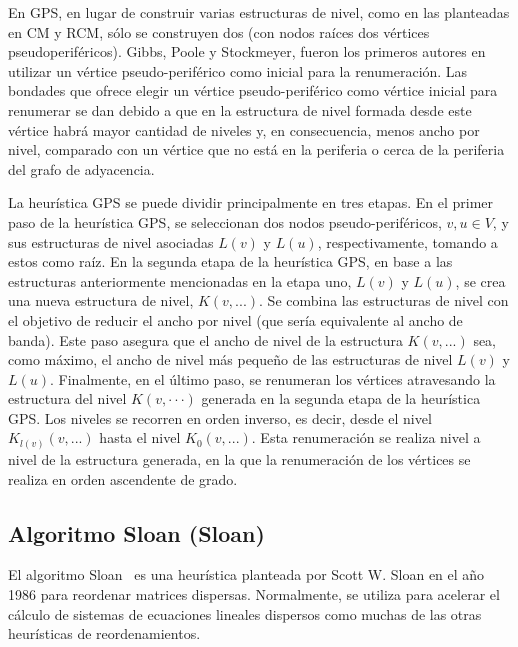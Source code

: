 En GPS, en lugar de construir varias estructuras de nivel, como en las planteadas en CM y RCM,  sólo se construyen dos (con nodos raíces dos vértices pseudoperiféricos). Gibbs, Poole y Stockmeyer, fueron los primeros autores en utilizar un vértice pseudo-periférico como inicial para la renumeración. Las bondades que ofrece elegir un vértice pseudo-periférico como vértice inicial para renumerar se dan debido a que en la estructura de nivel formada desde este vértice habrá mayor cantidad de niveles y, en consecuencia, menos ancho por nivel, comparado con un vértice que no está en la periferia o cerca de la periferia del grafo de adyacencia.

La heurística GPS se puede dividir principalmente en tres etapas. 
En el primer paso de la heurística GPS, se seleccionan dos nodos pseudo-periféricos, $v, u \in V$, y sus estructuras de nivel asociadas $\mathit{L}(v)$ y $\mathit{L}(u)$, respectivamente, tomando a estos como raíz.
En la segunda etapa de la heurística GPS, en base a las estructuras anteriormente mencionadas en la etapa uno, $L(v)$ y $L(u)$, se crea una nueva estructura de nivel, $K(v, ...)$. Se combina las estructuras de nivel con el objetivo de reducir el ancho por nivel (que sería equivalente al ancho de banda). Este paso asegura que el ancho de nivel de la estructura $K (v, ...)$ sea, como máximo, el ancho de nivel más pequeño de las estructuras de nivel $\mathit{L}(v)$ y $\mathit{L}(u)$.
Finalmente, en el último paso, se renumeran los vértices atravesando la estructura del nivel $K(v, ···)$ generada en la segunda etapa de la heurística GPS. Los niveles se recorren en orden inverso, es decir, desde el nivel $K_{l(v)}(v, ...)$ hasta el nivel $K_{0}(v, ...)$. Esta renumeración se realiza nivel a nivel de la estructura generada, en la que la renumeración de los vértices se realiza en orden ascendente de grado. 



\subsection{Algoritmo Sloan (Sloan)}


El algoritmo Sloan~\cite{Sloan1986} es una heurística planteada por Scott W. Sloan en el año 1986 para reordenar matrices dispersas. Normalmente, se utiliza para acelerar el cálculo de sistemas de ecuaciones lineales dispersos como muchas de las otras heurísticas de reordenamientos. 

